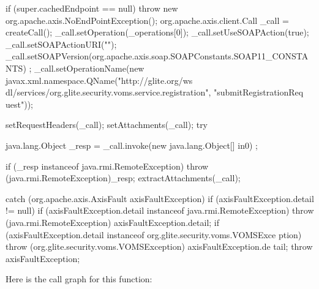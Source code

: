 \begin{DoxyCode}
                                                                                 
                                                                                       
                           {
        if (super.cachedEndpoint == null) {
            throw new org.apache.axis.NoEndPointException();
        }
        org.apache.axis.client.Call _call = createCall();
        _call.setOperation(_operations[0]);
        _call.setUseSOAPAction(true);
        _call.setSOAPActionURI("");
        _call.setSOAPVersion(org.apache.axis.soap.SOAPConstants.SOAP11_CONSTANTS)
      ;
        _call.setOperationName(new javax.xml.namespace.QName("http://glite.org/ws
      dl/services/org.glite.security.voms.service.registration", "submitRegistrationReq
      uest"));

        setRequestHeaders(_call);
        setAttachments(_call);
 try {        java.lang.Object _resp = _call.invoke(new java.lang.Object[] {in0})
      ;

        if (_resp instanceof java.rmi.RemoteException) {
            throw (java.rmi.RemoteException)_resp;
        }
        extractAttachments(_call);
  } catch (org.apache.axis.AxisFault axisFaultException) {
    if (axisFaultException.detail != null) {
        if (axisFaultException.detail instanceof java.rmi.RemoteException) {
              throw (java.rmi.RemoteException) axisFaultException.detail;
         }
        if (axisFaultException.detail instanceof org.glite.security.voms.VOMSExce
      ption) {
              throw (org.glite.security.voms.VOMSException) axisFaultException.de
      tail;
         }
   }
  throw axisFaultException;
}
    }
\end{DoxyCode}


Here is the call graph for this function:



